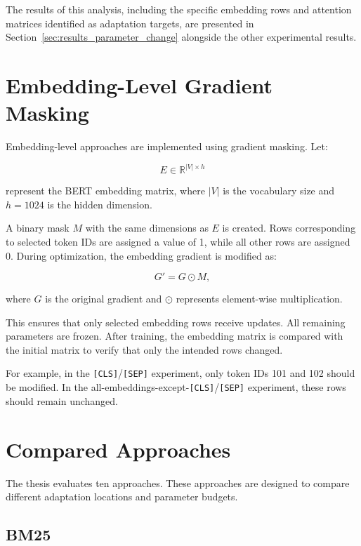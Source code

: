 The results of this analysis, including the specific embedding rows and attention matrices identified as adaptation targets, are presented in Section~\ref{sec:results_parameter_change} alongside the other experimental results.


\section{Embedding-Level Gradient Masking}
\label{sec:methodology_gradient_masking}

Embedding-level approaches are implemented using gradient masking. Let:

\begin{equation}
    E \in \mathbb{R}^{|V| \times h}
\end{equation}

represent the BERT embedding matrix, where $|V|$ is the vocabulary size and $h=1024$ is the hidden dimension.

A binary mask $M$ with the same dimensions as $E$ is created. Rows corresponding to selected token IDs are assigned a value of 1, while all other rows are assigned 0. During optimization, the embedding gradient is modified as:

\begin{equation}
    G' = G \odot M,
\end{equation}

where $G$ is the original gradient and $\odot$ represents element-wise multiplication.

This ensures that only selected embedding rows receive updates. All remaining parameters are frozen. After training, the embedding matrix is compared with the initial matrix to verify that only the intended rows changed.

For example, in the \texttt{[CLS]}/\texttt{[SEP]} experiment, only token IDs 101 and 102 should be modified. In the all-embeddings-except-\texttt{[CLS]}/\texttt{[SEP]} experiment, these rows should remain unchanged.

\section{Compared Approaches}
\label{sec:methodology_compared_approaches}

The thesis evaluates ten approaches. These approaches are designed to compare different adaptation locations and parameter budgets.

\subsection{BM25}
\label{subsec:methodology_bm25}

